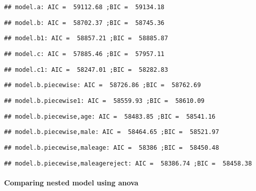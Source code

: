 \documentclass[
]{article}
\begin{document}
\begin{verbatim}
## model.a: AIC =  59112.68 ;BIC =  59134.18
\end{verbatim}

\begin{verbatim}
## model.b: AIC =  58702.37 ;BIC =  58745.36
\end{verbatim}

\begin{verbatim}
## model.b1: AIC =  58857.21 ;BIC =  58885.87
\end{verbatim}

\begin{verbatim}
## model.c: AIC =  57885.46 ;BIC =  57957.11
\end{verbatim}

\begin{verbatim}
## model.c1: AIC =  58247.01 ;BIC =  58282.83
\end{verbatim}

\begin{verbatim}
## model.b.piecewise: AIC =  58726.86 ;BIC =  58762.69
\end{verbatim}

\begin{verbatim}
## model.b.piecewise1: AIC =  58559.93 ;BIC =  58610.09
\end{verbatim}

\begin{verbatim}
## model.b.piecewise,age: AIC =  58483.85 ;BIC =  58541.16
\end{verbatim}

\begin{verbatim}
## model.b.piecewise,male: AIC =  58464.65 ;BIC =  58521.97
\end{verbatim}

\begin{verbatim}
## model.b.piecewise,maleage: AIC =  58386 ;BIC =  58450.48
\end{verbatim}

\begin{verbatim}
## model.b.piecewise,maleagereject: AIC =  58386.74 ;BIC =  58458.38
\end{verbatim}

\hypertarget{comparing-nested-model-using-anova}{%
\paragraph{Comparing nested model using
anova}\label{comparing-nested-model-using-anova}}
\end{document}
